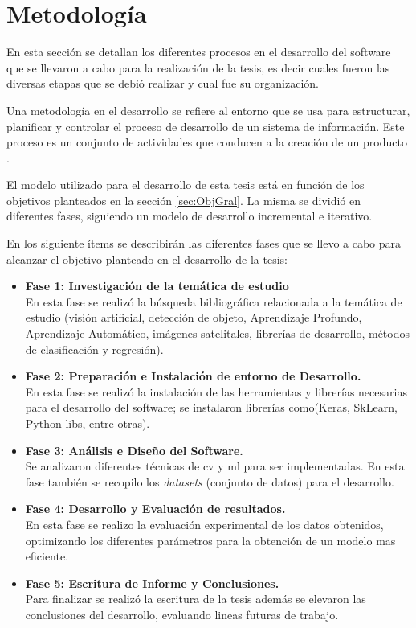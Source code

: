 \section{Metodología}\label{sec:metodologia}
En esta sección se detallan los diferentes procesos en el desarrollo del software que se llevaron a cabo para la realización de la tesis, es decir cuales fueron las diversas etapas que se debió realizar y cual fue su organización.

Una metodología en el desarrollo se refiere al entorno que se usa para estructurar, planificar y controlar el proceso de desarrollo de un sistema de información. Este proceso es un conjunto de actividades que conducen a la creación de un producto \citep{sommerville}.


El modelo utilizado para el desarrollo de esta tesis está en función de los objetivos planteados en la sección \ref{sec:ObjGral}. La misma se dividió en diferentes fases, siguiendo un modelo de desarrollo incremental e iterativo.

En los siguiente ítems se describirán las diferentes fases que se llevo a cabo para alcanzar el objetivo planteado en el desarrollo de la tesis:
\begin{itemize}
	\item \textbf{Fase 1: Investigación de la temática de estudio}\\
	En esta fase se realizó la búsqueda bibliográfica relacionada a la temática de estudio (visión artificial, detección de objeto, 
	Aprendizaje Profundo, Aprendizaje Automático, imágenes satelitales, librerías de desarrollo, métodos de clasificación y regresión).
	\item \textbf{Fase 2: Preparación e Instalación de entorno de Desarrollo.}\\
	En esta fase se realizó la instalación de las herramientas y librerías necesarias para el desarrollo del software; se instalaron librerías  
como(Keras, SkLearn, Python-libs, entre otras).
	\item \textbf{Fase 3: Análisis e Diseño del Software.}\\
	Se analizaron diferentes técnicas de \ac{cv} y \ac{ml} para ser implementadas. En esta fase también se recopilo los \textit{datasets} (conjunto de datos) para el desarrollo.
	\item \textbf{Fase 4: Desarrollo y Evaluación de resultados.}\\
	En esta fase se realizo la evaluación experimental de los datos obtenidos, optimizando los diferentes parámetros para la obtención de un 
modelo mas eficiente.
	\item \textbf{Fase 5: Escritura de Informe y Conclusiones.}\\
	Para finalizar se realizó la escritura de la tesis además se elevaron las conclusiones del desarrollo, evaluando lineas futuras de trabajo.
\end{itemize}


